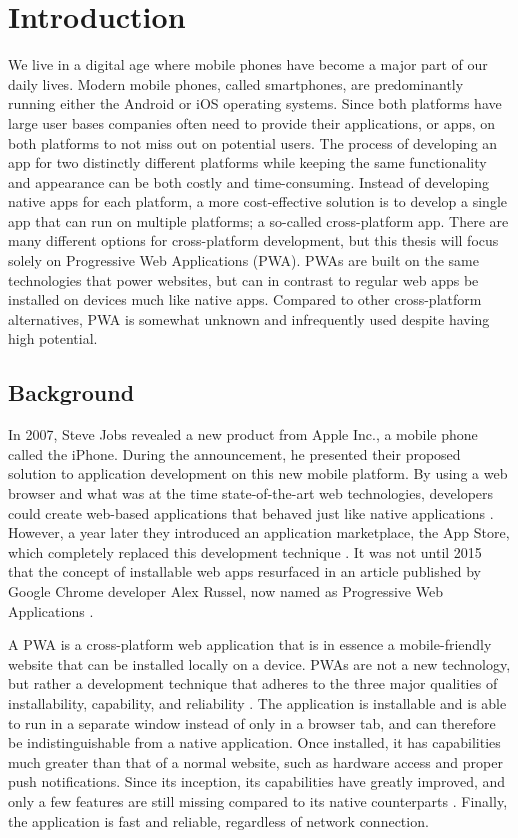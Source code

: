 \documentclass[a4paper,12pt]{article}
\begin{document}
\section{Introduction}
\label{Intro}
We live in a digital age where mobile phones have become a major part of our daily lives. Modern mobile phones, called smartphones, are predominantly running either the Android or iOS operating systems. Since both platforms have large user bases companies often need to provide their applications, or apps, on both platforms to not miss out on potential users. The process of developing an app for two distinctly different platforms while keeping the same functionality and appearance can be both costly and time-consuming. Instead of developing native apps for each platform, a more cost-effective solution is to develop a single app that can run on multiple platforms; a so-called cross-platform app. There are many different options for cross-platform development, but this thesis will focus solely on Progressive Web Applications (PWA). PWAs are built on the same technologies that power websites, but can in contrast to regular web apps be installed on devices much like native apps. Compared to other cross-platform alternatives, PWA is somewhat unknown and infrequently used despite having high potential. 

\subsection{Background}
\label{Intro_background}
In 2007, Steve Jobs revealed a new product from Apple Inc., a mobile phone called the iPhone. During the announcement, he presented their proposed solution to application development on this new mobile platform. By using a web browser and what was at the time state-of-the-art web technologies, developers could create web-based applications that behaved just like native applications \cite{stevejobs_pwa}. However, a year later they introduced an application marketplace, the App Store, which completely replaced this development technique \cite{stevejobs_appstore}. It was not until 2015 that the concept of installable web apps resurfaced in an article published by Google Chrome developer Alex Russel, now named as Progressive Web Applications \cite{russel_pwa}.

A PWA is a cross-platform web application that is in essence a mobile-friendly website that can be installed locally on a device. PWAs are not a new technology, but rather a development technique that adheres to the three major qualities of installability, capability, and reliability \cite{whatarepwas}. The application is installable and is able to run in a separate window instead of only in a browser tab, and can therefore be indistinguishable from a native application. Once installed, it has capabilities much greater than that of a normal website, such as hardware access and proper push notifications. Since its inception, its capabilities have greatly improved, and only a few features are still missing compared to its native counterparts \cite{whatwebcando}. Finally, the application is fast and reliable, regardless of network connection.
\end{document}
